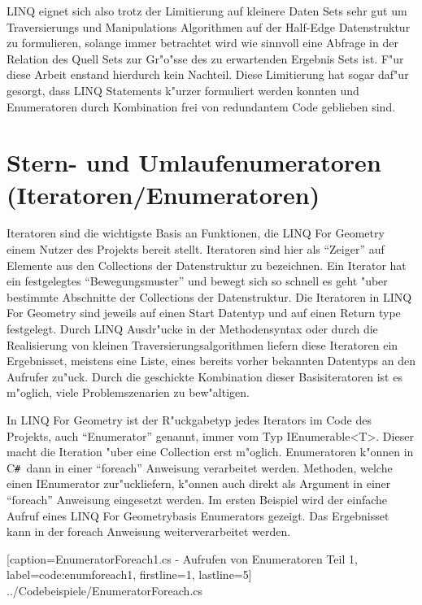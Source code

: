\documentclass[pagesize, paper=a4, fontsize=12pt,titlepage=true, headings=small, headnosepline, abstractoff, liststotoc, nochapterprefix, plainheadsepline]{scrreprt}
\newcommand{\CSS}{C\texttt{\# }}
\newcommand{\LFG}{LINQ For Geometry}
\newcommand{\LFGS}{LINQ For Geometry }
\newcommand{\HES}{Half-Edge Datenstruktur }
\begin{document}
LINQ eignet sich also trotz der Limitierung auf kleinere Daten Sets sehr gut um Traversierungs und Manipulations Algorithmen auf der \HES zu formulieren, solange immer betrachtet wird wie sinnvoll eine Abfrage in der Relation des Quell Sets zur Gr"o"sse des zu erwartenden Ergebnis Sets ist. F"ur diese Arbeit enstand hierdurch kein Nachteil. Diese Limitierung hat sogar daf"ur gesorgt, dass LINQ Statements k"urzer formuliert werden konnten und Enumeratoren durch Kombination frei von redundantem Code geblieben sind.
	\section {Stern- und Umlaufenumeratoren (Iteratoren/Enumeratoren) \label{part:iteratoren}}
		Iteratoren sind die wichtigste Basis an Funktionen, die \LFGS einem Nutzer des Projekts bereit stellt. Iteratoren sind hier als "`Zeiger"' auf Elemente aus den Collections der Datenstruktur zu bezeichnen. Ein Iterator hat ein festgelegtes "`Bewegungsmuster"' und bewegt sich so schnell es geht "uber bestimmte Abschnitte der Collections der Datenstruktur. Die Iteratoren in \LFGS sind jeweils auf einen Start Datentyp und auf einen Return type festgelegt. Durch LINQ Ausdr"ucke in der Methodensyntax oder durch die Realisierung von kleinen Traversierungsalgorithmen liefern diese Iteratoren ein Ergebnisset, meistens eine Liste, eines bereits vorher bekannten Datentyps an den Aufrufer zu"uck. Durch die geschickte Kombination dieser Basisiteratoren ist es m"oglich, viele Problemszenarien zu bew"altigen.

In \LFGS ist der R"uckgabetyp jedes Iterators im Code des Projekts, auch "`Enumerator"' genannt, immer vom Typ IEnumerable<T>. Dieser macht die Iteration "uber eine Collection erst m"oglich. Enumeratoren k"onnen in \CSS dann in einer "`foreach"' Anweisung verarbeitet werden. Methoden, welche einen IEnumerator zur"uckliefern, k"onnen auch direkt als Argument in einer "`foreach"' Anweisung eingesetzt werden.
Im ersten Beispiel wird der einfache Aufruf eines \LFG basis Enumerators gezeigt. Das Ergebnisset kann in der foreach Anweisung weiterverarbeitet werden.


			[caption={EnumeratorForeach1.cs - Aufrufen von Enumeratoren Teil 1}, label=code:enumforeach1, firstline=1, lastline=5]
			{../Codebeispiele/EnumeratorForeach.cs}
\end{document}
